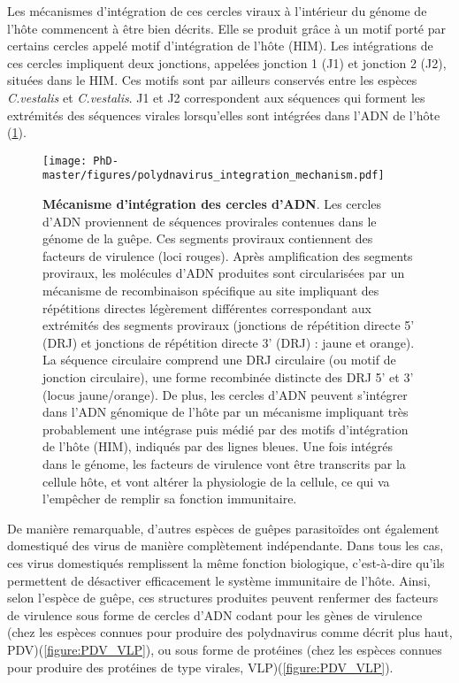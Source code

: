 Les mécanismes d'intégration de ces cercles viraux à l'intérieur du génome de l'hôte commencent à être bien décrits. Elle se produit grâce à un motif porté par certains cercles appelé motif d'intégration de l'hôte (HIM)\citep{beck_encapsidated_2011,chevignon_cotesia_2018,muller_genome-wide_2021}. Les intégrations de ces cercles impliquent deux jonctions, appelées jonction 1 (J1) et jonction 2 (J2), situées dans le HIM. Ces motifs sont par ailleurs conservés entre les espèces \textit{C.vestalis} et \textit{C.vestalis}\citep{mao_complete_2022}. J1 et J2 correspondent aux séquences qui forment les extrémités des séquences virales lorsqu'elles sont intégrées dans l'ADN de l'hôte (\figurename{\ref{figure:polydnavirus_integration_mechanism}}).

\begin{figure}[H]
\captionsetup{font=footnotesize}
 \centering
  \texttt{[image: PhD-master/figures/polydnavirus\_integration\_mechanism.pdf]}
\caption[Intro:Mécanisme d'intégration des cercles d'ADN]{\textbf{Mécanisme d'intégration des cercles d'ADN}. Les cercles d'ADN proviennent de séquences provirales contenues dans le génome de la guêpe. Ces segments proviraux contiennent des facteurs de virulence (loci rouges). Après amplification des segments proviraux, les molécules d'ADN produites sont circularisées par un mécanisme de recombinaison spécifique au site impliquant des répétitions directes légèrement différentes correspondant aux extrémités des segments proviraux (jonctions de répétition directe 5' (DRJ) et jonctions de répétition directe 3' (DRJ) : jaune et orange). La séquence circulaire comprend une DRJ circulaire (ou motif de jonction circulaire), une forme recombinée distincte des DRJ 5' et 3' (locus jaune/orange). De plus, les cercles d'ADN peuvent s'intégrer dans l'ADN génomique de l'hôte par un mécanisme impliquant très probablement une intégrase puis médié par des motifs d'intégration de l'hôte (HIM), indiqués par des lignes bleues. Une fois intégrés dans le génome, les facteurs de virulence vont être transcrits par la cellule hôte, et vont altérer la physiologie de la cellule, ce qui va l'empêcher de remplir sa fonction immunitaire.}
\label{figure:polydnavirus_integration_mechanism}
\end{figure}

De manière remarquable, d'autres espèces de guêpes parasitoïdes ont également domestiqué des virus de manière complètement indépendante. Dans tous les cas, ces virus domestiqués remplissent la même fonction biologique, c'est-à-dire qu'ils permettent de désactiver efficacement le système immunitaire de l'hôte.  Ainsi, selon l'espèce de guêpe, ces structures produites peuvent renfermer des facteurs de virulence sous forme de cercles d'ADN codant pour les gènes de virulence (chez les espèces connues pour produire des polydnavirus comme décrit plus haut, PDV)(\figurename{\ref{figure:PDV_VLP}}), ou sous forme de protéines (chez les espèces connues pour produire des protéines de type virales, VLP)(\figurename{\ref{figure:PDV_VLP}}). 

